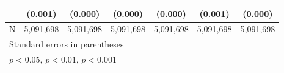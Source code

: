 {\begin{tabular}{l*{6}{c}}
                    &     (0.001)         &     (0.000)         &     (0.000)         &     (0.000)         &     (0.001)         &     (0.000)         \\
\hline
N                   &   5,091,698         &   5,091,698         &   5,091,698         &   5,091,698         &   5,091,698         &   5,091,698         \\
\hline\hline
\multicolumn{7}{l}{\footnotesize Standard errors in parentheses}\\
\multicolumn{7}{l}{\footnotesize \sym{*} \(p<0.05\), \sym{**} \(p<0.01\), \sym{***} \(p<0.001\)}\\
\end{tabular}
}
